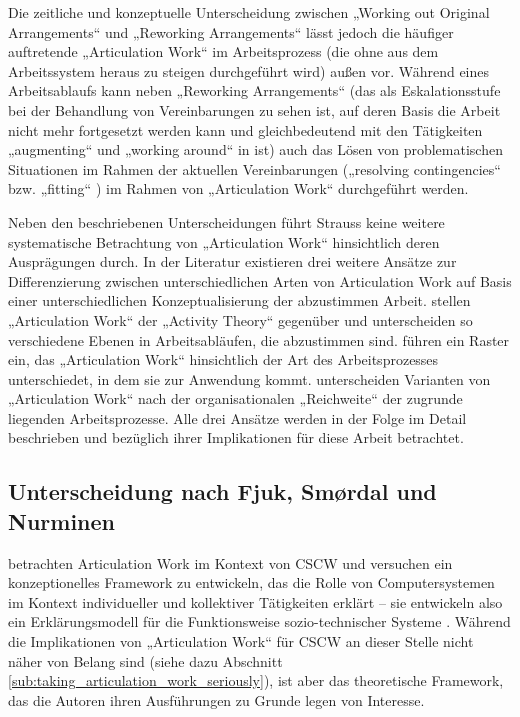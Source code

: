 Die zeitliche und konzeptuelle Unterscheidung zwischen „Working out Original Arrangements“ und „Reworking Arrangements“ lässt jedoch die häufiger auftretende „Articulation Work“ im Arbeitsprozess (die ohne aus dem Arbeitssystem heraus zu steigen durchgeführt wird) außen vor. Während eines Arbeitsablaufs kann neben „Reworking Arrangements“ (das als Eskalationsstufe bei der Behandlung von Vereinbarungen zu sehen ist, auf deren Basis die Arbeit nicht mehr fortgesetzt werden kann und gleichbedeutend mit den Tätigkeiten „augmenting“ und „working around“ in \citep{Gasser86} ist) auch das Lösen von problematischen Situationen im Rahmen der aktuellen Vereinbarungen („resolving contingencies“ \citep{Gerson86} bzw. „fitting“ \citep{Gasser86}) im Rahmen von „Articulation Work“ durchgeführt werden.

Neben den beschriebenen Unterscheidungen führt Strauss keine weitere systematische Betrachtung von „Articulation Work“ hinsichtlich deren Ausprägungen durch. In der Literatur existieren drei weitere Ansätze zur Differenzierung zwischen unterschiedlichen Arten von Articulation Work auf Basis einer unterschiedlichen Konzeptualisierung der abzustimmen Arbeit. \citet{Fjuk97} stellen „Articulation Work“ der „Activity Theory“ \citep{Leontev78} gegenüber und unterscheiden so verschiedene Ebenen in Arbeitsabläufen, die abzustimmen sind. \citet{Hampson05} führen ein Raster ein, das „Articulation Work“ hinsichtlich der Art des Arbeitsprozesses unterschiedet, in dem sie zur Anwendung kommt. \citet{Faergemann05} unterscheiden Varianten von „Articulation Work“ nach der organisationalen „Reichweite“ der zugrunde liegenden Arbeitsprozesse. Alle drei Ansätze werden in der Folge im Detail beschrieben und bezüglich ihrer Implikationen für diese Arbeit betrachtet.

\subsection{Unterscheidung nach Fjuk, Smørdal und Nurminen}
\label{sub:arten_fjuk}

\citet{Fjuk97} betrachten Articulation Work im Kontext von \gls{CSCW} und versuchen ein konzeptionelles Framework zu entwickeln, das die Rolle von Computersystemen im Kontext individueller und kollektiver Tätigkeiten erklärt -- sie entwickeln also ein Erklärungsmodell für die Funktionsweise sozio-technischer Systeme \citep{Emery60}. Während die Implikationen von „Articulation Work“ für \gls{CSCW} an dieser Stelle nicht näher von Belang sind (siehe dazu Abschnitt \ref{sub:taking_articulation_work_seriously}), ist aber das theoretische Framework, das die Autoren ihren Ausführungen zu Grunde legen von Interesse. 

